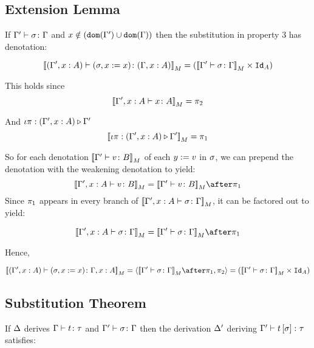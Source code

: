 \documentclass{report}
\begin{document}
\subsection{Extension Lemma}
If $\Gamma' \vdash \sigma \colon \Gamma$ and $x\notin(\texttt{dom}(\Gamma')\cup\texttt{dom}(\Gamma))$ then the substitution in property 3 has denotation:

\begin{equation}
    {\bf [\![}(\Gamma', x:A) \vdash (\sigma, x:= x) \colon (\Gamma, x: A){\bf ]\!]}_M = ({\bf [\![}\Gamma' \vdash \sigma \colon \Gamma{\bf ]\!]}_M\times \texttt{Id}_{A})
\end{equation}

This holds since 
\begin{equation}
    {\bf [\![}\Gamma', x:A \vdash x \colon A{\bf ]\!]}_M = \pi_2
\end{equation}

And $\iota\pi : (\Gamma',x:A) \triangleright \Gamma'$
\begin{equation}
    {\bf [\![}\iota\pi : (\Gamma',x:A) \triangleright \Gamma'{\bf ]\!]}_M = \pi_1
\end{equation}

So for each denotation ${\bf [\![}\Gamma' \vdash v \colon B{\bf ]\!]}_M$ of each $y:= v$ in $\sigma$, we can prepend the denotation with the weakening denotation to yield: 
\begin{equation}
    \deno{\typerelation{\G',x:A}{v}{B}} = \deno{\typerelation{\G'}{v}{B}}\after\p
\end{equation}
Since $\pi_1$ appears in every branch of ${\bf [\![}\Gamma', x:A \vdash \sigma \colon \Gamma{\bf ]\!]}_M$, it can be factored out to yield:

\begin{equation}
    \deno{\typerelation{\G', x:A}{\si}{\G}} = \deno{\typerelation{\G'}{\si}{\G}}\after\p
\end{equation}

Hence,

\begin{equation}
    \deno{\typerelation{(\G', x:A)}{(\si, x\setto x)}{\gax}} = \pr{\deno{\typerelation{\G'}{\si}{\G}}\after\p}{\pp} = (\deno{\typerelation{\G'}{\si}{\G}}\times \Id{A})
\end{equation}
\subsection{Substitution Theorem}

If $\Delta$ derives $\Gamma \vdash t \colon \tau$ and $\Gamma' \vdash \sigma \colon \Gamma$ then the derivation $\Delta'$ deriving $\Gamma' \vdash t\left[\sigma\right] \colon \tau$ satisfies:
\end{document}
